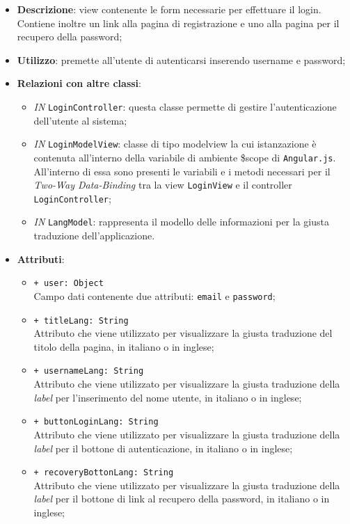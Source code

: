 \begin{itemize}
	\item \textbf{Descrizione}: view contenente le form necessarie per effettuare il login. Contiene inoltre un link alla pagina di registrazione e uno alla pagina per il recupero della password;
	\item \textbf{Utilizzo}: premette all'utente di autenticarsi inserendo username e password;
	\item \textbf{Relazioni con altre classi}:
	\begin{itemize}
		\item \textit{IN} \texttt{LoginController}: questa classe permette di gestire l'autenticazione dell'utente al sistema;
		\item \textit{IN} \texttt{LoginModelView}: classe di tipo modelview la cui istanzazione è contenuta all'interno della variabile di ambiente \$scope di \texttt{Angular.js}. All'interno di essa sono presenti le variabili e i metodi necessari per il \textit{Two-Way Data-Binding} tra la view \texttt{LoginView} e il controller \texttt{LoginController};
		\item \textit{IN} \texttt{LangModel}: rappresenta il modello delle informazioni per la giusta traduzione dell'applicazione.
	\end{itemize}
	\item \textbf{Attributi}:
	\begin{itemize}
		\item \texttt{+ user: Object} \\ Campo dati contenente due attributi: \texttt{email} e \texttt{password};
		\item \texttt{+ titleLang: String} \\ Attributo che viene utilizzato per visualizzare la giusta traduzione del titolo della pagina, in italiano o in inglese;
		\item \texttt{+ usernameLang: String} \\ Attributo che viene utilizzato per visualizzare la giusta traduzione della \textit{label} per l'inserimento del nome utente, in italiano o in inglese; 
		\item \texttt{+ buttonLoginLang: String} \\ Attributo che viene utilizzato per visualizzare la giusta traduzione della \textit{label} per il bottone di autenticazione, in italiano o in inglese;
		\item \texttt{+ recoveryBottonLang: String} \\ Attributo che viene utilizzato per visualizzare la giusta traduzione della \textit{label} per il bottone di link al recupero della password, in italiano o in inglese;

\end{itemize}
\end{itemize}
